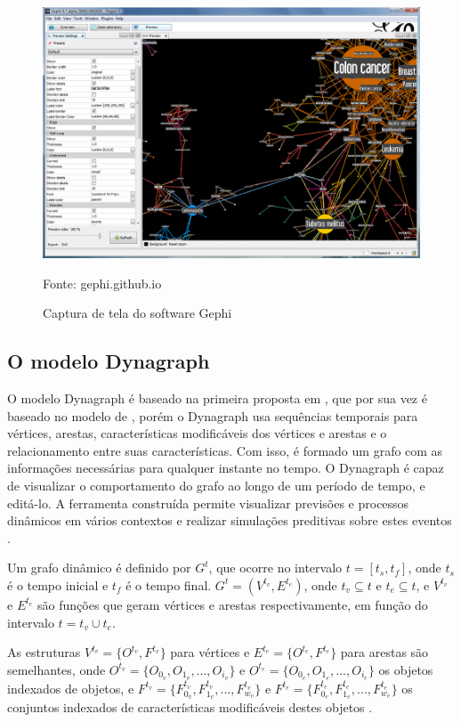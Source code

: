 \begin{figure}[htbp]
\centering
 \includegraphics[width=.90\textwidth]{chapters/fig/gephiDois.png}
\caption{Captura de tela do software Gephi}
Fonte: gephi.github.io
\label{fig:gephiDois}
\end{figure}
\FloatBarrier

\pagebreak

\subsection{O modelo Dynagraph}
O modelo Dynagraph \cite{dynagraph} é baseado na primeira proposta em \cite{dynagraph2012}, que por sua vez é baseado no modelo
de \cite{kim}, porém o Dynagraph usa sequências temporais para vértices, arestas, características modificáveis dos vértices e arestas e
o relacionamento entre suas características. Com isso, é formado um grafo com as informações necessárias para qualquer instante no tempo.
O Dynagraph é capaz de visualizar o comportamento do grafo ao longo de um período de tempo, e editá-lo. A ferramenta construída permite
visualizar previsões e processos dinâmicos em vários contextos e realizar simulações preditivas sobre estes eventos \cite{dynagraph}.

Um grafo dinâmico é definido por $G^t$, que ocorre no intervalo $t = [t_s,t_f]$, onde $t_s$ é o tempo inicial e $t_f$ é o tempo final.
$G^t = (V^{t_v}, E^{t_e})$, onde $t_v \subseteq t$ e $t_e \subseteq t$, e $V^{t_v}$ e $E^{t_e}$ são funções que geram vértices e arestas
respectivamente, em função do intervalo $t=t_v \cup t_e$.

As estruturas $V^{t_v} = \{O^{t_v}, F^{t_v}\}$ para vértices e $E^{t_e} = \{O^{t_e}, F^{t_e}\}$ para arestas são semelhantes,
onde $O^{t_v} = \{O_{0_v}, O_{1_v},..., O_{i_v}\}$ e $O^{t_e} = \{O_{0_e}, O_{1_e},..., O_{i_e}\}$ os objetos indexados de objetos,
e $F^{t_v} = \{F^{t_v}_{0_v}, F^{t_v}_{1_v},..., F^{t_v}_{w_v}\}$ e $F^{t_e} = \{F^{t_e}_{0_e}, F^{t_e}_{1_e},..., F^{t_e}_{w_e}\}$ os
conjuntos indexados de características modificáveis destes objetos \cite{dynagraph}.

